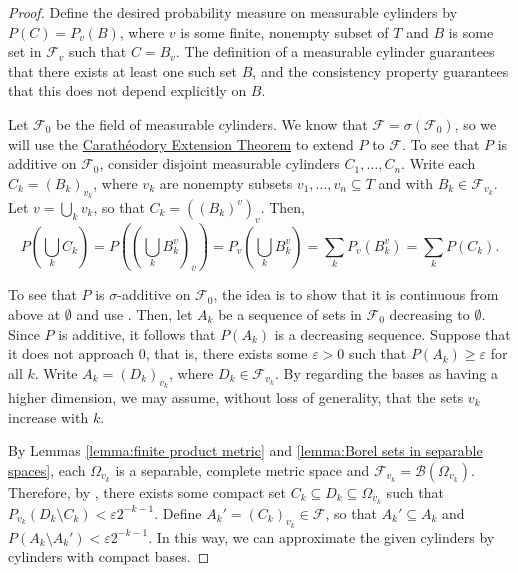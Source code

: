 \begin{proof}
		Define the desired probability measure on measurable cylinders by
		\(P(C)=P_v(B)\), where \(v\) is some finite, nonempty subset of \(T\) and \(B\) is some set in \(\mathcal{F}_v\) such that \(C=B_v\). The definition of a measurable cylinder guarantees that there exists at least one such set \(B\), and the consistency property guarantees that this does not depend explicitly on \(B\).

Let \(\mathcal{F}_0\) be the field of measurable cylinders. We know that
\(\mathcal{F}=\sigma(\mathcal{F}_0)\), so we will use the
\hyperref[theorem:Caratheodory Extension]{Carathéodory Extension Theorem} to
extend \(P\) to \(\mathcal{F}\). To see that \(P\) is additive on
\(\mathcal{F}_0\), consider disjoint measurable cylinders \(C_1,\dots,C_n\). Write each \(C_k=\left(B_k\right)_{v_k}\), where \(v_k\) are nonempty subsets \(v_1,\dots,v_n\subseteq T\) and with
\(B_k\in\mathcal{F}_{v_k}\). Let \(v=\bigcup_{k}v_k\), so that \(C_k=\left(\left(B_k\right)^v\right)_v\). Then,
\[
		P\left(\bigcup_{k}C_k\right)=P\left( \left(\bigcup_{k}B_k^{v}\right)_v\right)=P_v\left(\bigcup_{k}B_k^v\right)=\sum_{k} P_v\left(B_k^v\right)=\sum_{k} P(C_k)
.\]

To see that \(P\) is \(\sigma\)-additive on \(\mathcal{F}_0\), the idea is to show that it is continuous from above at \(\emptyset\) and use . Then, let \(A_k\) be a sequence of sets in \(\mathcal{F}_0\) decreasing to \(\emptyset\). Since \(P\) is additive, it follows that \(P(A_k)\) is a decreasing sequence. Suppose that it does not approach \(0\), that is, there exists some \(\varepsilon>0\) such that \(P(A_k)\geq \varepsilon\) for all \(k\).
Write \(A_k=\left(D_k\right)_{v_k}\), where \(D_k\in\mathcal{F}_{v_k}\). By regarding the bases as having a higher dimension, we may assume, without loss of generality, that the sets \(v_k\) increase with \(k\).

By Lemmas \ref{lemma:finite product metric} and \ref{lemma:Borel sets in separable spaces}, each \(\Omega_{v_k}\) is a separable, complete metric space and \(\mathcal{F}_{v_k}=\mathscr{B}\left(\Omega_{v_k}\right)\). Therefore, by , there exists some compact set \(C_k\subseteq D_k\subseteq\Omega_{v_k}\) such that \(P_{v_k}\left(D_k\setminus C_k\right)<\varepsilon 2^{-k-1}\). Define \(A_k'=\left(C_k\right)_{v_k}\in\mathcal{F}\), so that \(A_k'\subseteq A_k\) and \(P\left(A_k\setminus A_k'\right)<\varepsilon 2^{-k-1}\). In this way, we can approximate the given cylinders by cylinders with compact bases.


\end{proof}
